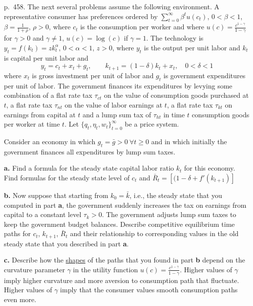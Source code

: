 \documentclass[12pt, letterpaper]{article}
\begin{document}
\begin{tcolorbox}[oddbox,title={Exercise 11.7 \quad Capital taxes: unforeseen, foreseen, and the role of $\gamma$}]
\begin{tcolorbox}[questionbox]
p.~458. The next several problems assume the following environment. A representative consumer has preferences ordered by
$\sum_{t=0}^\infty\beta^tu(c_t)$, $0<\beta<1$, $\beta=\frac1{1+\rho}$, $\rho>0$, where $c_t$ is the consumption per worker
and where $u(c)=\frac{c^{1-\gamma}}{1-\gamma}$ for $\gamma>0$ and $\gamma\ne1$, $u(c)=\log(c)$ if $\gamma=1$. The technology
is $y_t=f(k_t)=zk_t^\alpha$, $0<\alpha<1$, $z>0$, where $y_t$ is the output per unit labor and $k_t$ is capital per unit
labor and
\[
y_t=c_t+x_t+g_t,\qquad k_{t+1}=(1-\delta)k_t+x_t,\quad0<\delta<1
\]
where $x_t$ is gross investment per unit of labor and $g_t$ is government expenditures per unit of labor. The government
finances its expenditures by levying some combination of a flat rate tax $\tau_{ct}$ on the value of consumption goods
purchased at $t$, a flat rate tax $\tau_{nt}$ on the value of labor earnings at $t$, a flat rate tax $\tau_{kt}$ on
earnings from capital at $t$ and a lump sum tax of $\tau_{ht}$ in time $t$ consumption goods per worker at time $t$. Let
$\{q_t,\eta_t,w_t\}_{t=0}^\infty$ be a price system.

Consider an economy in which $g_t=\bar g>0\ \forall t\ge0$ and in which initially the government finances all expenditures
by lump sum taxes.

\textbf{a.} Find a formula for the steady state capital labor ratio $k_t$ for this economy. Find formulas for the steady
state level of $c_t$ and $\bar R_t=[(1-\delta+f'(k_{t+1})]$

\textbf{b.} Now suppose that starting from $k_0=\bar k$, i.e., the steady state that you computed in part \textbf{a}, the
government suddenly increases the tax on earnings from capital to a constant level $\tau_k>0$. The government adjusts lump
sum taxes to keep the government budget balances. Describe competitive equilibrium time paths for $c_t$, $k_{t+1}$,
$\bar R_t$ and their relationship to corresponding values in the old steady state that you described in part
\textbf{a}.

\textbf{c.} Describe how the \underline{shapes} of the paths that you found in part \textbf{b} depend on the curvature
parameter $\gamma$ in the utility function $u(c)=\frac{c^{1-\gamma}}{1-\gamma}$. Higher values of $\gamma$ imply higher
curvature and more aversion to consumption path that fluctuate. Higher values of $\gamma$ imply that the consumer values
smooth consumption paths even more.


\end{tcolorbox}
\end{tcolorbox}
\end{document}
